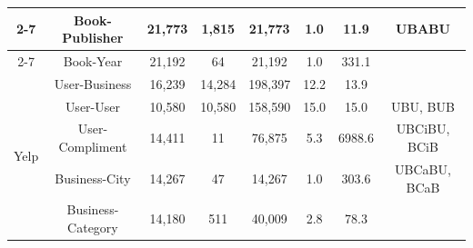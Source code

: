 \begin{table}[t]
{\begin{tabular}{|c||c|c|c|c|c|c|c|}
\cline{2-7}
\multirow{5}{*}{} & {Book-Publisher} & {21,773} & {1,815} & {21,773} & {1.0} & {11.9} & \multirow{2}{*}{UBABU} \\
\cline{2-7}
\multirow{5}{*}{} & {Book-Year} & {21,192} & {64} & {21,192} & {1.0} & {331.1} & \multirow{2}{*}{} \\
\hline
\hline
\multirow{5}{*}{Yelp} & {User-Business} & {16,239} & {14,284} & {198,397} & {12.2} & {13.9} &{} \\
\cline{2-7}
\multirow{5}{*}{(0.08\%)} & {User-User} & {10,580} & {10,580} & {158,590} & {15.0} & {15.0} &{UBU, BUB} \\
\cline{2-7}
\multirow{5}{*}{} & {User-Compliment} & {14,411} & {11} & {76,875} & {5.3} & {6988.6} & {UBCiBU, BCiB} \\
\cline{2-7}
\multirow{5}{*}{} & {Business-City} & {14,267} & {47} & {14,267} & {1.0} & {303.6} & {UBCaBU, BCaB} \\
\cline{2-7}
\multirow{5}{*}{} & {Business-Category} & {14,180} & {511} & {40,009} & {2.8} & {78.3} & {} \\
\hline

\end{tabular}}
\end{table}



